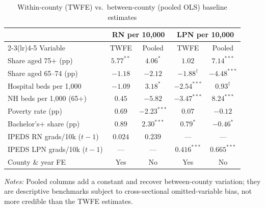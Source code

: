 \begin{table}[!htbp]
\centering
\caption{Within-county (TWFE) vs.\ between-county (pooled OLS) baseline estimates}
\label{tab:pooled}
\small
\begin{tabular}{lcccc}
\toprule
 & \multicolumn{2}{c}{RN per 10{,}000} & \multicolumn{2}{c}{LPN per 10{,}000} \\
\cmidrule(lr){2-3}\cmidrule(lr){4-5}
Variable & TWFE & Pooled & TWFE & Pooled \\
\midrule
Share aged 75$+$ (pp) & $5.77^{**}$ & $4.06^{*}$ & $1.02$ & $7.14^{***}$ \\
Share aged 65--74 (pp) & $-1.18$ & $-2.12$ & $-1.88^{\dagger}$ & $-4.48^{***}$ \\
Hospital beds per 1{,}000 & $-1.09$ & $3.18^{*}$ & $-2.54^{***}$ & $0.93^{\dagger}$ \\
NH beds per 1{,}000 (65$+$) & $0.45$ & $-5.82$ & $-3.47^{***}$ & $8.24^{***}$ \\
Poverty rate (pp) & $0.69$ & $-2.23^{***}$ & $0.07$ & $-0.12$ \\
Bachelor's$+$ share (pp) & $0.89$ & $2.30^{***}$ & $0.79^{*}$ & $-0.46^{*}$ \\
IPEDS RN grads/10k ($t-1$) & $0.024$ & $0.239$ & --- & --- \\
IPEDS LPN grads/10k ($t-1$) & --- & --- & $0.416^{***}$ & $0.665^{***}$ \\
\midrule
County \& year FE & Yes & No & Yes & No \\
\bottomrule
\end{tabular}
\par\medskip\footnotesize\textit{Notes:} Pooled columns add a constant and recover between-county variation; they are descriptive benchmarks subject to cross-sectional omitted-variable bias, not more credible than the TWFE estimates.
\end{table}

